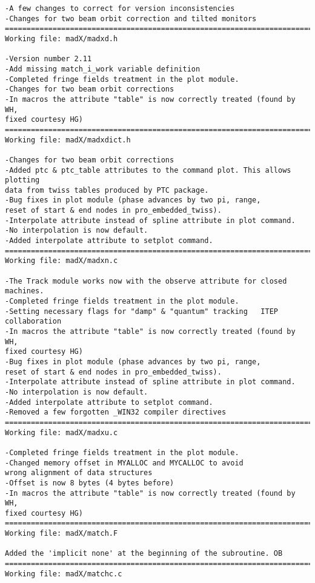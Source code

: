 \begin{verbatim}
-A few changes to correct for version inconsistencies
-Changes for two beam orbit correction and tilted monitors
=============================================================================
Working file: madX/madxd.h

-Version number 2.11
-Add missing match_i_work variable definition
-Completed fringe fields treatment in the plot module.
-Changes for two beam orbit corrections
-In macros the attribute "table" is now correctly treated (found by WH,
fixed courtesy HG)
=============================================================================
Working file: madX/madxdict.h

-Changes for two beam orbit corrections
-Added ptc & ptc_table attributes to the command plot. This allows plotting
data from twiss tables produced by PTC package.
-Bug fixes in plot module (phase advances by two pi, range,
reset of start & end nodes in pro_embedded_twiss).
-Interpolate attribute instead of spline attribute in plot command.
-No interpolation is now default.
-Added interpolate attribute to setplot command.
=============================================================================
Working file: madX/madxn.c

-The Track module works now with the observe attribute for closed machines. 
-Completed fringe fields treatment in the plot module.
-Setting necessary flags for "damp" & "quantum" tracking   ITEP collaboration
-In macros the attribute "table" is now correctly treated (found by WH,
fixed courtesy HG)
-Bug fixes in plot module (phase advances by two pi, range,
reset of start & end nodes in pro_embedded_twiss).
-Interpolate attribute instead of spline attribute in plot command.
-No interpolation is now default.
-Added interpolate attribute to setplot command.
-Removed a few forgotten _WIN32 compiler directives
=============================================================================
Working file: madX/madxu.c

-Completed fringe fields treatment in the plot module.
-Changed memory offset in MYALLOC and MYCALLOC to avoid
wrong alignment of data structures
-Offset is now 8 bytes (4 bytes before)
-In macros the attribute "table" is now correctly treated (found by WH,
fixed courtesy HG)
=============================================================================
Working file: madX/match.F

Added the 'implicit none' at the beginning of the subroutine. OB
=============================================================================
Working file: madX/matchc.c


\end{verbatim}

